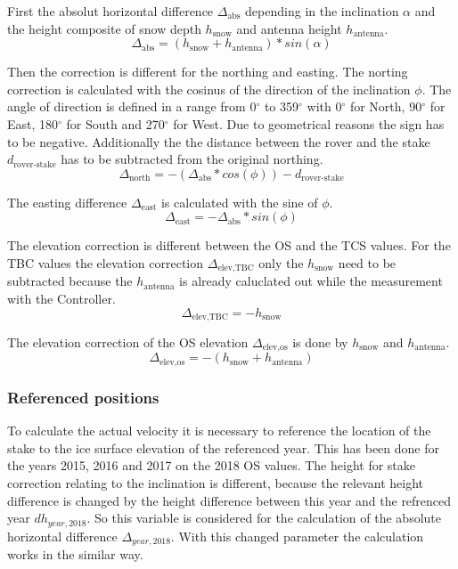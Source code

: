 First the absolut horizontal difference $\Delta_{\text{abs}}$ depending in the inclination $\alpha$ and the height composite of snow depth $h_{\text{snow}}$ and antenna height $h_{\text{antenna}}$.
\begin{equation}
	\Delta_{\text{abs}} = (h_{\text{snow}} + h_{\text{antenna}}) * sin(\alpha)
\end{equation}

Then the correction is different for the northing and easting. The norting correction is calculated with the cosinus of the direction of the inclination $\phi$. 
The angle of direction is defined in a range from 0$^{\circ}$ to 359$^{\circ}$ with 0$^{\circ}$ for North, 90$^{\circ}$ for East, 180$^{\circ}$ for South and 270$^{\circ}$ for West.
Due to geometrical reasons the sign has to be negative. 
Additionally the the distance between the rover and the stake $d_{\text{rover-stake}}$ has to be subtracted from the original northing.
\begin{equation}
	\Delta_{\text{north}} = - (\Delta_{\text{abs}} * cos(\phi)) - d_{\text{rover-stake}}
\end{equation}

The easting difference $\Delta_{\text{east}}$ is calculated with the sine of $\phi$.
\begin{equation}
	\Delta_{\text{east}} = - \Delta_{\text{abs}} * sin(\phi)
\end{equation}

The elevation correction is different between the OS and the TCS values.
For the TBC values the elevation correction $\Delta_{\text{elev,TBC}}$ only the $h_{\text{snow}}$ need to be subtracted because the $h_{\text{antenna}}$ is already caluclated out while the measurement with the Controller.
\begin{equation}
	\Delta_{\text{elev,TBC}} = - h_{\text{snow}} 
\end{equation}

The elevation correction of the OS elevation $\Delta_{\text{elev,os}}$ is done by $h_{\text{snow}}$ and $h_{\text{antenna}}$.
\begin{equation}
	\Delta_{\text{elev,os}} = - (h_{\text{snow}} + h_{\text{antenna}}) 
\end{equation}

\subsubsection*{Referenced positions}

To calculate the actual velocity it is necessary to reference the location of the stake to the ice surface elevation of the referenced year. 
This has been done for the years 2015, 2016 and 2017 on the 2018 OS values.
The height for stake correction relating to the inclination is different, because the relevant height difference is changed by the height difference between this year and the refrenced year $dh_{year,2018}$. So this variable is considered for the calculation of the absolute horizontal difference $\Delta_{year,2018}$. With this changed parameter the calculation works in the similar way.

